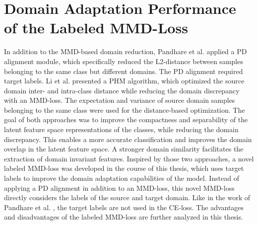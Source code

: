 \section{Domain Adaptation Performance of the Labeled MMD-Loss}
In addition to the MMD-based domain reduction, Pandhare et al. \cite{Pandhare2021} applied a PD alignment module, which specifically reduced the L2-distance between samples belonging to the same class but different domains. The PD alignment required target labels. Li et al. \cite{Li2018} presented a PHM algorithm, which optimized the source domain inter- and intra-class distance while reducing the domain discrepancy with an MMD-loss. The expectation and variance of source domain samples belonging to the same class were used for the distance-based optimization. The goal of both approaches was to improve the compactness and separability of the latent feature space representations of the classes, while reducing the domain discrepancy. This enables a more accurate classification and improves the domain overlap in the latent feature space. A stronger domain similarity facilitates the extraction of domain invariant features. Inspired by those two approaches, a novel labeled MMD-loss was developed in the course of this thesis, which uses target labels to improve the domain adaptation capabilities of the model. Instead of applying a PD alignment in addition to an MMD-loss, this novel MMD-loss directly considers the labels of the source and target domain. Like in the work of Pandhare et al. \cite{Pandhare2021}, the target labels are not used in the CE-loss. The advantages and disadvantages of the labeled MMD-loss are further analyzed in this thesis.

